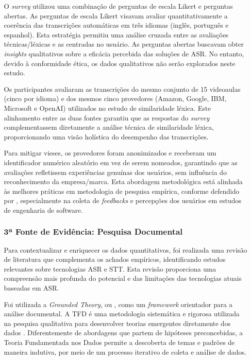 O \textit{survey} utilizou uma combinação de perguntas de escala Likert e perguntas abertas. As perguntas de escala Likert visavam avaliar quantitativamente a coerência das transcrições automáticas em três idiomas (inglês, português e espanhol). Esta estratégia permitiu uma análise cruzada entre as avaliações técnicas/léxicas e as centradas no usuário. As perguntas abertas buscavam obter \textit{insights} qualitativos sobre a eficácia percebida das soluções de ASR. No entanto, devido à conformidade ética, os dados qualitativos não serão explorados neste estudo.

Os participantes avaliaram as transcrições do mesmo conjunto de 15 videoaulas (cinco por idioma) e dos mesmos cinco provedores (Amazon, Google, IBM, Microsoft e OpenAI) utilizados no estudo de similaridade léxica. Este alinhamento entre as duas fontes garantiu que as respostas do \textit{survey} complementassem diretamente a análise técnica de similaridade léxica, proporcionando uma visão holística do desempenho das transcrições.

Para mitigar vieses, os provedores foram anonimizados e receberam um identificador numérico aleatório em vez de serem nomeados, garantindo que as avaliações refletissem experiências genuínas dos usuários, sem influência do reconhecimento da empresa/marca. Esta abordagem metodológica está alinhada às melhores práticas em metodologia de pesquisa empírica, conforme defendido por \cite{Sommerville2015}, especialmente na coleta de \textit{feedbacks} e percepções dos usuários em estudos de engenharia de software.

\subsubsection{3ª Fonte de Evidência: Pesquisa Documental}

Para contextualizar e enriquecer os dados quantitativos, foi realizada uma revisão de literatura que complementa os achados empíricos, identificando estudos relevantes sobre tecnologias ASR e STT. Esta revisão proporciona uma compreensão mais profunda do potencial e das limitações das tecnologias atuais baseadas em ASR.

Foi utilizada a \textit{Grounded Theory}, ou , como um \textit{framework} orientador para a análise documental. A TFD é uma metodologia sistemática e rigorosa utilizada na pesquisa qualitativa para desenvolver teorias emergentes diretamente dos dados \cite{Charmaz2009}. Diferentemente de abordagens que partem de hipóteses preconcebidas, a Teoria Fundamentada nos Dados permite a descoberta de temas e padrões de maneira indutiva, por meio de um processo iterativo de coleta e análise de dados.

